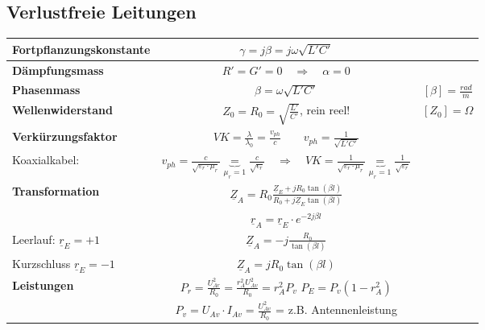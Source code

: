 	
	\subsection{Verlustfreie Leitungen}
		\renewcommand{\arraystretch}{1.5}
		\begin{tabular}{| l | c | c |}
			\hline
				\textbf{Fortpflanzungskonstante}
				& $\gamma=j\beta=j\omega \sqrt{L'C'} $
				&\\
			\hline
				\textbf{Dämpfungsmass}
				& $R'=G'=0\quad \Rightarrow \quad \alpha=0$
				&\\
			\hline
				\textbf{Phasenmass}
				& $\beta=\omega\sqrt{L'C'}$
				& $[\beta] = \frac{rad}{m}$\\
			\hline
				\textbf{Wellenwiderstand}
				& $Z_0 = R_0 =\sqrt{\frac{L'}{C'}}$, rein reel!
				& $[Z_0] = \Omega$\\
			\hline
				\textbf{Verkürzungsfaktor}
				& $ VK = \frac{\lambda}{\lambda_0}=\frac{v_{ph}}{c} \qquad v_{ph} = \frac{1}{\sqrt{L'C'}}$ &\\
				\hfill Koaxialkabel:& $v_{ph} = \frac{c}{\sqrt{\varepsilon_r \cdot \mu_r}}  \underbrace{=}_{\mu_r = 1} \frac{c}{\sqrt{\epsilon_r}} \quad \Rightarrow \quad VK = \frac{1}{\sqrt{\varepsilon_r \cdot \mu_r}} \underbrace{=}_{\mu_r = 1} \frac{1}{\sqrt{\varepsilon_r}} $ & \\ 
			\hline
				\textbf{Transformation}
				& $\underline{Z}_A=R_0\frac{\underline{Z}_{E}+jR_0\tan(\beta l)}{R_0+j\underline{Z}_{E}\tan(\beta l)}$
				&\\
				& $\underline{r}_A=\underline{r}_E\cdot e^{-2j\beta l}$
				&\\
			\cline{2-3}
				\hfill Leerlauf: $ \underline{r}_E=+1$
				& $\underline{Z}_A=-j\frac{R_0}{\tan(\beta l)}$
				&\\
				\hfill Kurzschluss $ \underline{r}_E=-1$
				& $\underline{Z}_A=j R_0 \tan(\beta l)$
				&\\
			\hline
                 \textbf{Leistungen}
                 &
                 $P_r= \frac{U^2_{Ar}}{R_0}=\frac{r_A^2U^2_{Av}}{R_0}=r_A^2 P_v$\qquad
                 $P_{E}=P_v(1-r_A^2)$ & \\
                 & $P_v = U_{Av} \cdot               I_{Av} = \frac{U^2_{Av}}{R_0}$ = z.B. Antennenleistung &\\
             \hline
		\end{tabular}
